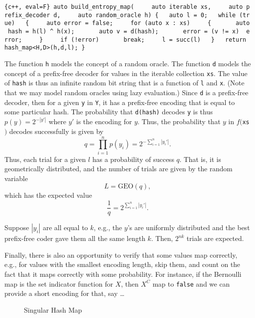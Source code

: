 \documentclass[
  letterpaper,
  DIV=11,
  numbers=noendperiod]{scrartcl}
\theoremstyle{remark}
\begin{document}
\texttt{\{c++,\ eval=F\}\ auto\ build\_entropy\_map(\ \ \ \ \ auto\ iterable\ xs,\ \ \ \ \ auto\ prefix\_decoder\ d,\ \ \ \ \ auto\ random\_oracle\ h)\ \{\ \ \ auto\ l\ =\ 0;\ \ \ while\ (true)\ \ \ \{\ \ \ \ \ auto\ error\ =\ false;\ \ \ \ \ for\ (auto\ x\ :\ xs)\ \ \ \ \ \{\ \ \ \ \ \ \ auto\ hash\ =\ h(l)\ \^{}\ h(x);\ \ \ \ \ \ \ auto\ v\ =\ d(hash);\ \ \ \ \ \ \ error\ =\ (v\ !=\ x)\ \textbar{}\textbar{}\ error;\ \ \ \ \ \}\ \ \ \ \ if\ (!error)\ \ \ \ \ \ \ break;\ \ \ \ \ l\ =\ succ(l)\ \ \ \}\ \ \ return\ hash\_map\textless{}H,D\textgreater{}(h,d,l);\ \}}

The function \texttt{h} models the concept of a random oracle. The
function \texttt{d} models the concept of a prefix-free decoder for
values in the iterable collection \texttt{xs}. The value of
\texttt{hash} is thus an infinite random bit string that is a function
of \texttt{l} and \texttt{x}. (Note that we may model random oracles
using lazy evaluation.) Since \texttt{d} is a prefix-free decoder, then
for a given \texttt{y} in \texttt{Y}, it has a prefix-free encoding that
is equal to some particular hash. The probability that \texttt{d(hash)}
decodes \texttt{y} is thus \(p(y) = 2^{-|y'|}\) where \(y'\) is the
encoding for \(y\). Thus, the probability that \(y\) in
\(f(\)\texttt{xs}\()\) decodes successfully is given by \[
q = \prod_{i=1}^n p(y_i) = 2^{-\sum_{i=1}^n |y_i'|}.
\] Thus, each trial for a given \(l\) has a probability of success
\(q\). That is, it is geometrically distributed, and the number of
trials are given by the random variable \[
L = \mathrm{GEO}(q),
\] which has the expected value \[
\frac{1}{q} = 2^{\sum_{i=1}^n |y_i'|}.
\]

Suppose \(|y_i|\) are all equal to \(k\), e.g., the \(y\)'s are
uniformly distributed and the best prefix-free coder gave them all the
same length \(k\). Then, \(2^{n k}\) trials are expected.

Finally, there is also an opportunity to verify that some values map
correctly, e.g., for values with the smallest encoding length, skip
them, and count on the fact that it maps correctly with some
probability. For instance, if the Bernoulli map is the set indicator
function for \(X\), then \(X^C\) map to \texttt{false} and we can
provide a short encoding for that, say \ldots{}

\begin{figure}
    \centering
    
    \caption{Singular Hash Map}
    \label{fig:shmap}
\end{figure}
\end{document}
